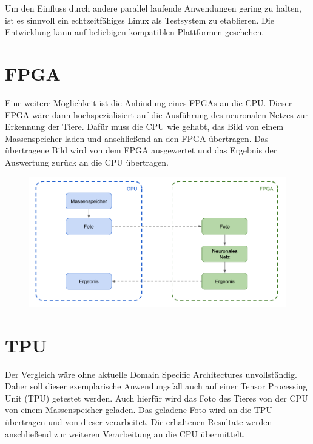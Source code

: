 Um den Einfluss durch andere parallel laufende Anwendungen gering zu halten, ist es sinnvoll ein echtzeitfähiges Linux als Testsystem zu etablieren. Die Entwicklung kann auf beliebigen kompatiblen Plattformen geschehen.

\newpage


\section*{\LARGE\textbf{FPGA}}

Eine weitere Möglichkeit ist die Anbindung eines FPGAs an die CPU. Dieser FPGA wäre dann hochspezialisiert auf die Ausführung des neuronalen Netzes zur Erkennung der Tiere. Dafür muss die CPU wie gehabt, das Bild von einem Massenspeicher laden und anschließend an den FPGA übertragen. Das übertragene Bild wird von dem FPGA ausgewertet und das Ergebnis der Auswertung zurück an die CPU übertragen. 

\begin{figure}[htbp]
	\centering
		\includegraphics[width=1.00\textwidth]{BilderPDF/zielsetzung/System-FPGA.png}
	\label{fig:System-FPGA}
\end{figure}

\newpage


\section*{\LARGE\textbf{TPU}}

Der Vergleich wäre ohne aktuelle Domain Specific Architectures unvollständig. Daher soll dieser exemplarische Anwendungsfall auch auf einer Tensor Processing Unit (TPU) getestet werden. Auch hierfür wird das Foto des Tieres von der CPU von einem Massenspeicher geladen. Das geladene Foto wird an die TPU übertragen und von dieser verarbeitet. Die erhaltenen Resultate werden anschließend zur weiteren Verarbeitung an die CPU übermittelt.

